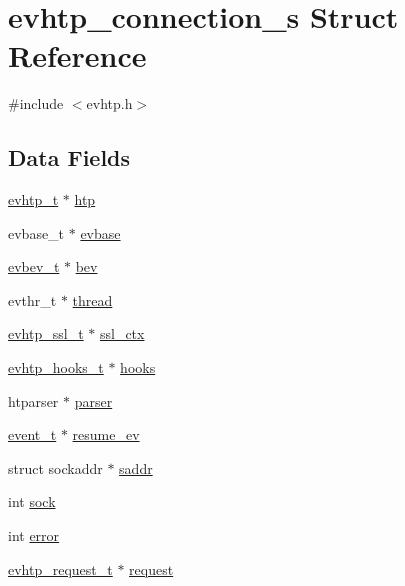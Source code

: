 \hypertarget{structevhtp__connection__s}{
\section{evhtp\_\-connection\_\-s Struct Reference}
\label{structevhtp__connection__s}
}


{\ttfamily \#include $<$evhtp.h$>$}

\subsection*{Data Fields}
\begin{DoxyCompactItemize}
\item 
\hyperlink{structevhtp__s}{evhtp\_\-t} $\ast$ \hyperlink{structevhtp__connection__s_ad2f5cc5c9e97f75f1fe923c57af9e875}{htp}
\item 
evbase\_\-t $\ast$ \hyperlink{structevhtp__connection__s_abc4ce26b166a97e5766105f253a4fe21}{evbase}
\item 
\hyperlink{evhtp_8h_af92ce7197ff545dc83b76f1650bc57e1}{evbev\_\-t} $\ast$ \hyperlink{structevhtp__connection__s_a56cc56e5934366a7ca14026f5be0b3dd}{bev}
\item 
evthr\_\-t $\ast$ \hyperlink{structevhtp__connection__s_aaf924ac18ad3dd26c8676d835116579e}{thread}
\item 
\hyperlink{evhtp_8h_a85b31561e6827b118669d514fe00aa3d}{evhtp\_\-ssl\_\-t} $\ast$ \hyperlink{structevhtp__connection__s_afddd0c7c8575888dd2faa52cc3596b1c}{ssl\_\-ctx}
\item 
\hyperlink{structevhtp__hooks__s}{evhtp\_\-hooks\_\-t} $\ast$ \hyperlink{structevhtp__connection__s_ac97663394f74c9030e57c771cfb7981e}{hooks}
\item 
htparser $\ast$ \hyperlink{structevhtp__connection__s_accaeb42c4c926437fc7921fa7910911b}{parser}
\item 
\hyperlink{evhtp_8h_ad0c066ffb009d3286186a124d37a0c2d}{event\_\-t} $\ast$ \hyperlink{structevhtp__connection__s_a7a583b9c2322f322b8785b9cff0e9585}{resume\_\-ev}
\item 
struct sockaddr $\ast$ \hyperlink{structevhtp__connection__s_a95957a2d67e88843dae4b71c658b6ecb}{saddr}
\item 
int \hyperlink{structevhtp__connection__s_a5903d0b282fc5eae503de618f896b5e1}{sock}
\item 
int \hyperlink{structevhtp__connection__s_a11614f44ef4d939bdd984953346a7572}{error}
\item 
\hyperlink{structevhtp__request__s}{evhtp\_\-request\_\-t} $\ast$ \hyperlink{structevhtp__connection__s_a55db4995ccc7d4d06340bd057ff9f291}{request}
\end{DoxyCompactItemize}


